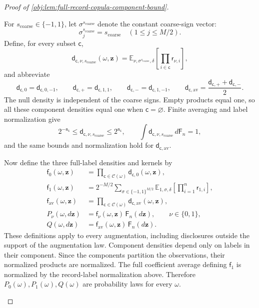 \begin{proof}[Proof of \cref{obj:lem:full-record-copula-component-bound}]
\begin{enumerate}
For \(s_{\mathrm{coarse}}\in\{-1,1\}\), let
\(\sigma^{s_{\mathrm{coarse}}}\) denote the constant coarse-sign vector:
\[
\sigma^{s_{\mathrm{coarse}}}_j=s_{\mathrm{coarse}}
\quad(1\le j\le M/2).
\]
Define, for every subset \(\mathsf c\),
\[
\mathsf d_{\mathsf c,\nu,s_{\mathrm{coarse}}}
 (\omega,\mathbf z)
 =
 \mathbb E_{\nu,\sigma^{s_{\mathrm{coarse}}},\delta}
 \left[\prod_{i\in\mathsf c}\mathsf r_{\nu,i}\right],
\]
and abbreviate
\[
\mathsf d_{\mathsf c,0}
 =\mathsf d_{\mathsf c,0,-1},
\qquad
\mathsf d_{\mathsf c,+}
 =\mathsf d_{\mathsf c,1,1},
\qquad
\mathsf d_{\mathsf c,-}
 =\mathsf d_{\mathsf c,1,-1},
\qquad
\mathsf d_{\mathsf c,\mathrm{av}}
 =\frac{\mathsf d_{\mathsf c,+}+\mathsf d_{\mathsf c,-}}2.
\]
The null density is independent of the coarse signs. Empty products equal one, so all these component densities equal one when \(\mathsf c=\varnothing\). Finite averaging and label normalization give
\[
2^{-\mathsf n_{\mathsf c}}
 \le\mathsf d_{\mathsf c,\nu,s_{\mathrm{coarse}}}
 \le2^{\mathsf n_{\mathsf c}},
\qquad
\int\mathsf d_{\mathsf c,\nu,s_{\mathrm{coarse}}}\,d\mathsf F_n=1,
\]
and the same bounds and normalization hold for
\(\mathsf d_{\mathsf c,\mathrm{av}}\).

Now define the three full-label densities and kernels by
\[
\begin{aligned}
\mathsf f_0(\omega,\mathbf z)
 &=\prod_{\mathsf c\in\mathscr C(\omega)}
       \mathsf d_{\mathsf c,0}(\omega,\mathbf z),\\
\mathsf f_1(\omega,\mathbf z)
 &=2^{-M/2}\sum_{\sigma\in\{-1,1\}^{M/2}}
   \mathbb E_{1,\sigma,\delta}
       \left[\prod_{i=1}^n\mathsf r_{1,i}\right],\\
\mathsf f_{\mathrm{av}}(\omega,\mathbf z)
 &=\prod_{\mathsf c\in\mathscr C(\omega)}
       \mathsf d_{\mathsf c,\mathrm{av}}(\omega,\mathbf z),\\
P_\nu(\omega,d\mathbf z)
 &=\mathsf f_\nu(\omega,\mathbf z)\,\mathsf F_n(d\mathbf z),
 \qquad \nu\in\{0,1\},\\
Q(\omega,d\mathbf z)
 &=\mathsf f_{\mathrm{av}}(\omega,\mathbf z)\,
       \mathsf F_n(d\mathbf z).
\end{aligned}
\]
These definitions apply to every augmentation, including disclosures outside the support of the augmentation law. Component densities depend only on labels in their component. Since the components partition the observations, their normalized products are normalized. The full coefficient average defining \(\mathsf f_1\) is normalized by the record-label normalization above. Therefore \(P_0(\omega),P_1(\omega),Q(\omega)\) are probability laws for every \(\omega\).


\end{enumerate}
\end{proof}
